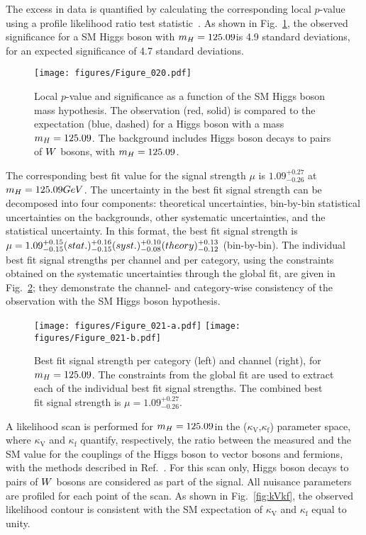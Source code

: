 The excess in data is quantified by calculating the corresponding local $p$-value using a profile likelihood ratio test statistic~\cite{LHC-HCG-Report,Chatrchyan:2012tx,Junk,Read:2002hq}.
As shown in Fig.~\ref{fig:pvalue}, the observed significance for a SM Higgs boson with $m_{H} = 125.09$\GeV is 4.9 standard deviations, for an expected
significance of 4.7 standard deviations.

\begin{figure}[!ht]
  \centering
    \texttt{[image: figures/Figure\_020.pdf]}
   \caption{Local ${p}$-value and significance as a function of the SM Higgs boson mass hypothesis. The observation (red, solid) is compared to the expectation (blue, dashed) for a Higgs boson with a mass $m_{H} = 125.09$\GeV. The background includes Higgs boson decays to pairs of $W$ bosons, with $m_{H} = 125.09$\GeV.}
    \label{fig:pvalue}

\end{figure}


The corresponding best fit value for the signal strength $\mu$ is $1.09 ^{+0.27} _{-0.26}$ at $m_{H} = 125.09GeV$. The uncertainty in the best fit signal strength can be decomposed into four components: theoretical uncertainties, bin-by-bin statistical uncertainties on the backgrounds, other systematic uncertainties, and the statistical uncertainty. In this format, the best fit signal strength is $\mu = 1.09^{+0.15}_{-0.15}(stat.){}^{+0.16}_{-0.15}(syst.){}^{+0.10}_{-0.08}(theory){}^{+0.13}_{-0.12}$ (bin-by-bin).
The individual best fit signal strengths per channel and per category, using the constraints obtained on the systematic uncertainties through the global fit, are given in Fig.~\ref{fig:muvalue}; they demonstrate the channel- and category-wise consistency of the observation with the SM Higgs boson hypothesis.

\begin{figure}[!ht]
  \centering
    \texttt{[image: figures/Figure\_021-a.pdf]}
    \texttt{[image: figures/Figure\_021-b.pdf]}
   \caption{Best fit signal strength per category (left) and channel (right), for $m_{H} = 125.09$\GeV. The constraints from the global fit are used to extract each of the individual best fit signal strengths. The combined best fit signal strength is $\mu = 1.09 ^{+0.27} _{-0.26}$.}
    \label{fig:muvalue}

\end{figure}

A likelihood scan is performed for $m_{H}=125.09$\GeV in the ($\kappa_\mathrm{V}$,$\kappa_\mathrm{f}$) parameter space, where $\kappa_\mathrm{V}$ and $\kappa_\mathrm{f}$ quantify, respectively, the ratio between the measured and the SM value for the couplings of the Higgs boson to vector bosons and fermions, with the methods described in Ref.~\cite{Chatrchyan:2014nva}. For this scan only, Higgs boson decays to pairs of $W$ bosons are considered as part of the signal. All nuisance parameters are profiled for each point of the scan. As shown in Fig.~\ref{fig:kVkf}, the observed likelihood contour is consistent with the SM expectation of $\kappa_\mathrm{V}$ and $\kappa_\mathrm{f}$ equal to unity.


